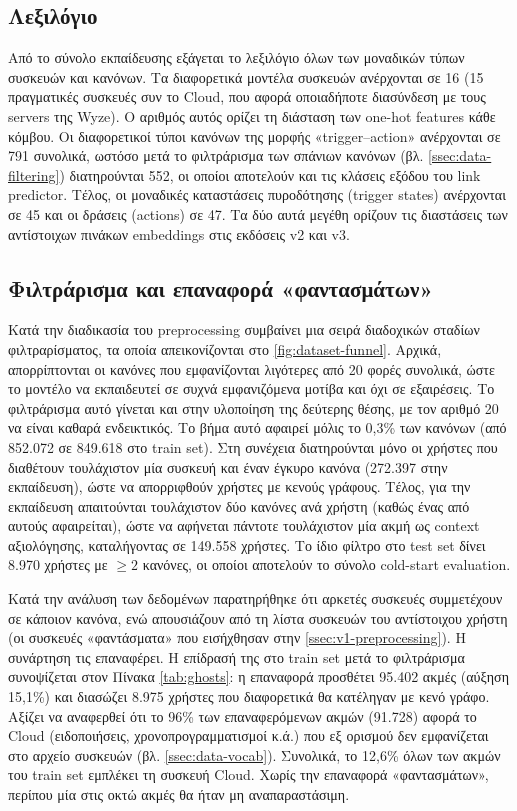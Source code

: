 \subsection{Λεξιλόγιο}\label{ssec:data-vocab}
Από το σύνολο εκπαίδευσης εξάγεται το λεξιλόγιο όλων των μοναδικών τύπων συσκευών και κανόνων. Τα διαφορετικά μοντέλα συσκευών ανέρχονται σε 16 (15 πραγματικές συσκευές συν το Cloud, που αφορά οποιαδήποτε διασύνδεση με τους servers της Wyze). Ο αριθμός αυτός ορίζει τη διάσταση των one-hot features κάθε κόμβου. Οι διαφορετικοί τύποι κανόνων της μορφής «trigger--action» ανέρχονται σε 791 συνολικά, ωστόσο μετά το φιλτράρισμα των σπάνιων κανόνων (βλ. \autoref{ssec:data-filtering}) διατηρούνται 552, οι οποίοι αποτελούν και τις κλάσεις εξόδου του link predictor. Τέλος, οι μοναδικές καταστάσεις πυροδότησης (trigger states) ανέρχονται σε 45 και οι δράσεις (actions) σε 47. Τα δύο αυτά μεγέθη ορίζουν τις διαστάσεις των αντίστοιχων πινάκων embeddings στις εκδόσεις v2 και v3.

\subsection{Φιλτράρισμα και επαναφορά «φαντασμάτων»}\label{ssec:data-filtering}
Κατά την διαδικασία του preprocessing συμβαίνει μια σειρά διαδοχικών σταδίων φιλτραρίσματος, τα οποία απεικονίζονται στο \autoref{fig:dataset-funnel}. Αρχικά, απορρίπτονται οι κανόνες που εμφανίζονται λιγότερες από 20 φορές συνολικά, ώστε το μοντέλο να εκπαιδευτεί σε συχνά εμφανιζόμενα μοτίβα και όχι σε εξαιρέσεις. Το φιλτράρισμα αυτό γίνεται και στην υλοποίηση της δεύτερης θέσης, με τον αριθμό 20 να είναι καθαρά ενδεικτικός. Το βήμα αυτό αφαιρεί μόλις το 0,3\% των κανόνων (από 852.072 σε 849.618 στο train set). Στη συνέχεια διατηρούνται μόνο οι χρήστες που διαθέτουν τουλάχιστον μία συσκευή και έναν έγκυρο κανόνα (272.397 στην εκπαίδευση), ώστε να απορριφθούν χρήστες με κενούς γράφους. Τέλος, για την εκπαίδευση απαιτούνται τουλάχιστον δύο κανόνες ανά χρήστη (καθώς ένας από αυτούς αφαιρείται), ώστε να αφήνεται πάντοτε τουλάχιστον μία ακμή ως context αξιολόγησης, καταλήγοντας σε 149.558 χρήστες. Το ίδιο φίλτρο στο test set δίνει 8.970 χρήστες με $\geq 2$ κανόνες, οι οποίοι αποτελούν το σύνολο cold-start evaluation.

Κατά την ανάλυση των δεδομένων παρατηρήθηκε ότι αρκετές συσκευές συμμετέχουν σε κάποιον κανόνα, ενώ απουσιάζουν από τη λίστα συσκευών του αντίστοιχου χρήστη (οι συσκευές «φαντάσματα» που εισήχθησαν στην \autoref{ssec:v1-preprocessing}). Η συνάρτηση  τις επαναφέρει. Η επίδρασή της στο train set μετά το φιλτράρισμα συνοψίζεται στον Πίνακα \ref{tab:ghosts}: η επαναφορά προσθέτει 95.402 ακμές (αύξηση 15,1\%) και διασώζει 8.975 χρήστες που διαφορετικά θα κατέληγαν με κενό γράφο. Αξίζει να αναφερθεί ότι το 96\% των επαναφερόμενων ακμών (91.728) αφορά το Cloud (ειδοποιήσεις, χρονοπρογραμματισμοί κ.ά.) που εξ ορισμού δεν εμφανίζεται στο αρχείο συσκευών (βλ. \autoref{ssec:data-vocab}). Συνολικά, το 12,6\% όλων των ακμών του train set εμπλέκει τη συσκευή Cloud. Χωρίς την επαναφορά «φαντασμάτων», περίπου μία στις οκτώ ακμές θα ήταν μη αναπαραστάσιμη.

